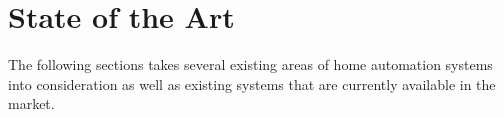 \section{State of the Art}
The following sections takes several existing areas of home automation systems into consideration as well as existing systems that are currently available in the market.




